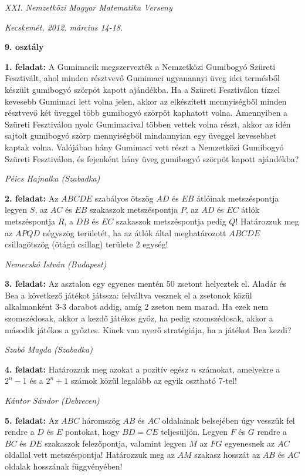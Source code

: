 \documentclass[a4paper,10pt]{article}
\def\ki#1#2{\hfill {\it #1 (#2)}\medskip}
\begin{document}
\begin{center} \Large {\em XXI. Nemzetközi Magyar Matematika Verseny} \end{center}
\begin{center} \large{\em Kecskemét, 2012. március 14-18.} \end{center}
\smallskip
\begin{center} \large{\bf 9. osztály} \end{center}
\bigskip 

{\bf 1. feladat: } A Gumimacik megszervezték a Nemzetközi Gumibogyó Szüreti Fesztivált, ahol minden
résztvevő Gumimaci ugyanannyi üveg idei termésből készült gumibogyó szörpöt kapott ajándékba.
Ha a Szüreti Fesztiválon tízzel kevesebb Gumimaci lett volna jelen, akkor az elkészített
mennyiségből minden résztvevő két üveggel több gumibogyó szörpöt kaphatott volna. Amennyiben
a Szüreti Fesztiválon nyolc Gumimacival többen vettek volna részt, akkor az idén sajtolt
gumibogyó szörp mennyiségből mindannyian egy üveggel kevesebbet kaptak volna. Valójában
hány Gumimaci vett részt a Nemzetközi Gumibogyó Szüreti Fesztiválon, és fejenként hány üveg
gumibogyó szörpöt kapott ajándékba?


\ki{Péics Hajnalka}{Szabadka}\medskip

{\bf 2. feladat: } Az $ABCDE$ szabályos ötszög $AD$ és $EB$ átlóinak metszéspontja legyen $S$, az $AC$ és $EB$ szakaszok
metszéspontja $P$, az $AD$ és $EC$ átlók metszéspontja $R$, a $DB$ és $EC$ szakaszok metszéspontja pedig
$Q$! Határozzuk meg az $APQD$ négyszög területét, ha az átlók által meghatározott $ABCDE$
csillagötszög (ötágú csillag) területe 2 egység!

\ki{Nemecskó István}{Budapest}\medskip

{\bf 3. feladat: } Az asztalon egy egyenes mentén 50 zsetont helyeztek el. Aladár és Bea a következő játékot
játssza: felváltva vesznek el a zsetonok közül alkalmanként 3-3 darabot addig, amíg 2 zseton nem
marad. Ha ezek nem szomszédosak, akkor a kezdő játékos győz, ha pedig szomszédosak, akkor a
második játékos a győztes. Kinek van nyerő stratégiája, ha a játékot Bea kezdi?

\ki{Szabó Magda}{Szabadka}\medskip

{\bf 4. feladat: } Határozzuk meg azokat a pozitív egész $n$ számokat, amelyekre a $2^n-1$ és a $2^n+1$ számok közül
legalább az egyik osztható 7-tel!

\ki{Kántor Sándor}{Debrecen}\medskip

{\bf 5. feladat: } Az $ABC$ háromszög $AB$ és $AC$ oldalainak belsejében úgy vesszük fel rendre a $D$ és $E$ pontokat,
hogy $BD=CE$ teljesüljön. Legyen $F$ és $G$ rendre a $BC$ és $DE$ szakaszok felezőpontja, valamint
legyen $M$ az $FG$ egyenesnek az $AC$ oldallal vett metszéspontja! Határozzuk meg az $AM$ szakasz
hosszát az $AB$ és $AC$ oldalak hosszának függvényében!
\end{document}

